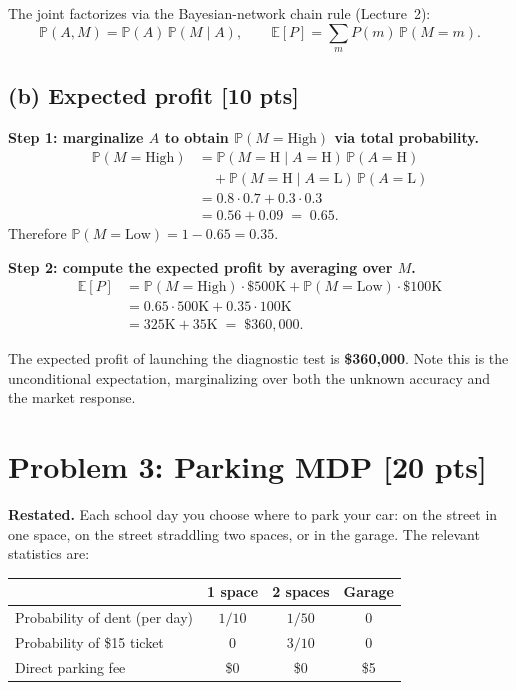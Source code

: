 \documentclass[12pt]{article}
\newcommand{\EE}{\mathbb{E}}
\newcommand{\Prb}{\mathbb{P}}
\begin{document}
The joint factorizes via the Bayesian-network chain rule (Lecture~2):
\[
  \Prb(A, M) = \Prb(A)\,\Prb(M \mid A), \qquad \EE[P] = \sum_{m} P(m)\,\Prb(M = m).
\]

\subsection*{(b) Expected profit \hfill [10 pts]}

\textbf{Step 1: marginalize $A$ to obtain $\Prb(M = \text{High})$ via total probability.}
\begin{align*}
  \Prb(M = \text{High})
  &= \Prb(M{=}\text{H} \mid A{=}\text{H})\,\Prb(A{=}\text{H}) \\
  &\quad + \Prb(M{=}\text{H} \mid A{=}\text{L})\,\Prb(A{=}\text{L}) \\
  &= 0.8 \cdot 0.7 + 0.3 \cdot 0.3 \\
  &= 0.56 + 0.09 \;=\; 0.65.
\end{align*}
Therefore $\Prb(M = \text{Low}) = 1 - 0.65 = 0.35$.

\textbf{Step 2: compute the expected profit by averaging over $M$.}
\begin{align*}
  \EE[P] &= \Prb(M=\text{High}) \cdot \$500\text{K} + \Prb(M=\text{Low}) \cdot \$100\text{K} \\
         &= 0.65 \cdot 500\text{K} + 0.35 \cdot 100\text{K} \\
         &= 325\text{K} + 35\text{K} \;=\; \boxed{\$360{,}000}.
\end{align*}

The expected profit of launching the diagnostic test is \textbf{\$360{,}000}. Note this is the unconditional expectation, marginalizing over both the unknown accuracy and the market response.

\section*{Problem 3: Parking MDP \hfill [20 pts]}

\textbf{Restated.} Each school day you choose where to park your car: on the street in one space, on the street straddling two spaces, or in the garage. The relevant statistics are:

\begin{center}
\begin{tabular}{lccc}
\toprule
& \textbf{1 space} & \textbf{2 spaces} & \textbf{Garage} \\
\midrule
Probability of dent (per day) & $1/10$ & $1/50$ & $0$ \\
Probability of \$15 ticket & $0$ & $3/10$ & $0$ \\
Direct parking fee & \$0 & \$0 & \$5 \\
\bottomrule
\end{tabular}
\end{center}
\end{document}
